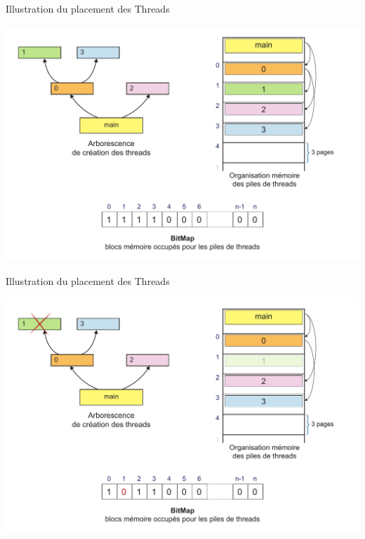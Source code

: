 \documentclass{beamer}
\begin{document}
\begin{frame}{Illustration du placement des Threads}
  	\begin{center}
	  	\includegraphics[scale=0.24]{images/FS3.png}
  	\end{center}
\end{frame}

\begin{frame}{Illustration du placement des Threads}
  	\begin{center}
	  	\includegraphics[scale=0.24]{images/FS4.png}
  	\end{center}
\end{frame}
\end{document}

